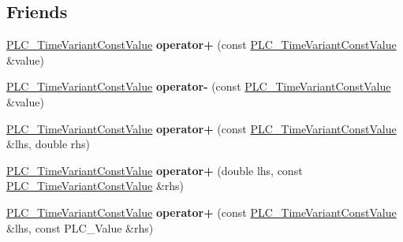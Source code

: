 \subsection*{\-Friends}
\begin{DoxyCompactItemize}
\item 
\hypertarget{classns3_1_1PLC__TimeVariantConstValue_a18abf5ad9ce5544205a3df9ab595a4d3}{\hyperlink{classns3_1_1PLC__TimeVariantConstValue}{\-P\-L\-C\-\_\-\-Time\-Variant\-Const\-Value} {\bfseries operator+} (const \hyperlink{classns3_1_1PLC__TimeVariantConstValue}{\-P\-L\-C\-\_\-\-Time\-Variant\-Const\-Value} \&value)}\label{classns3_1_1PLC__TimeVariantConstValue_a18abf5ad9ce5544205a3df9ab595a4d3}

\item 
\hypertarget{classns3_1_1PLC__TimeVariantConstValue_a68bb3e707836681264d3475bdf3139d8}{\hyperlink{classns3_1_1PLC__TimeVariantConstValue}{\-P\-L\-C\-\_\-\-Time\-Variant\-Const\-Value} {\bfseries operator-\/} (const \hyperlink{classns3_1_1PLC__TimeVariantConstValue}{\-P\-L\-C\-\_\-\-Time\-Variant\-Const\-Value} \&value)}\label{classns3_1_1PLC__TimeVariantConstValue_a68bb3e707836681264d3475bdf3139d8}

\item 
\hypertarget{classns3_1_1PLC__TimeVariantConstValue_ad4f5e6208873b2f5d3d214d02e97a565}{\hyperlink{classns3_1_1PLC__TimeVariantConstValue}{\-P\-L\-C\-\_\-\-Time\-Variant\-Const\-Value} {\bfseries operator+} (const \hyperlink{classns3_1_1PLC__TimeVariantConstValue}{\-P\-L\-C\-\_\-\-Time\-Variant\-Const\-Value} \&lhs, double rhs)}\label{classns3_1_1PLC__TimeVariantConstValue_ad4f5e6208873b2f5d3d214d02e97a565}

\item 
\hypertarget{classns3_1_1PLC__TimeVariantConstValue_abe0e0c47bc8b4c83f596f059affa8b17}{\hyperlink{classns3_1_1PLC__TimeVariantConstValue}{\-P\-L\-C\-\_\-\-Time\-Variant\-Const\-Value} {\bfseries operator+} (double lhs, const \hyperlink{classns3_1_1PLC__TimeVariantConstValue}{\-P\-L\-C\-\_\-\-Time\-Variant\-Const\-Value} \&rhs)}\label{classns3_1_1PLC__TimeVariantConstValue_abe0e0c47bc8b4c83f596f059affa8b17}

\item 
\hypertarget{classns3_1_1PLC__TimeVariantConstValue_a9ab7203e9a54d88c3b3f31ee431d58bf}{\hyperlink{classns3_1_1PLC__TimeVariantConstValue}{\-P\-L\-C\-\_\-\-Time\-Variant\-Const\-Value} {\bfseries operator+} (const \hyperlink{classns3_1_1PLC__TimeVariantConstValue}{\-P\-L\-C\-\_\-\-Time\-Variant\-Const\-Value} \&lhs, const \-P\-L\-C\-\_\-\-Value \&rhs)}\label{classns3_1_1PLC__TimeVariantConstValue_a9ab7203e9a54d88c3b3f31ee431d58bf}


\end{DoxyCompactItemize}
